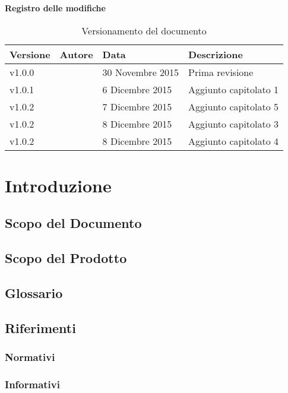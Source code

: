 \documentclass[12pt,a4paper]{article}
\begin{document}
\Large{\textbf{Registro delle modifiche}}\\
\normalsize

\begin{table}[h]
\begin{center}

\begin{tabular}{p{} p{} p{} p{}}
\toprule
\textbf{Versione}	&	\textbf{Autore}	&	\textbf{Data}	&	\textbf{Descrizione}\\
\midrule
\midrule
v1.0.0	&	\NDC	&	30 Novembre 2015 	&	Prima revisione\\
\midrule
v1.0.1	&	\TP	&	6 Dicembre 2015	&	Aggiunto capitolato 1\\
\midrule
v1.0.2	&	\TP	&	7 Dicembre 2015	&	Aggiunto capitolato 5\\
v1.0.2	&	\IB	&	8 Dicembre 2015	&	Aggiunto capitolato 3\\
\midrule
v1.0.2	&	\IB	&	8 Dicembre 2015	&	Aggiunto capitolato 4\\
\bottomrule
\end{tabular}
\caption{Versionamento del documento}
\label{tabVers1}
\end{center}
\end{table}
\newpage

\tableofcontents
\newpage

\section{Introduzione}
\subsection{Scopo del Documento}
\subsection{Scopo del Prodotto}
\subsection{Glossario}
\subsection{Riferimenti}
\subsubsection{Normativi}
\subsubsection{Informativi}
\end{document}
